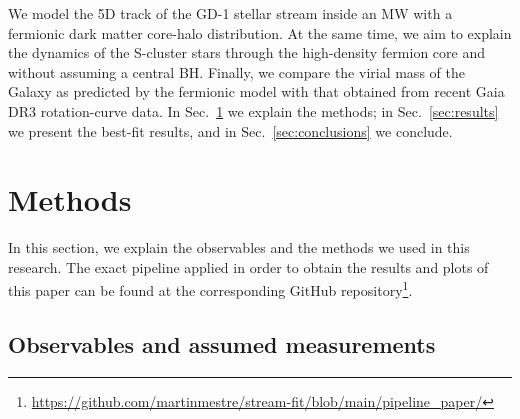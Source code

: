 \documentclass[twocolumn]{aa}
\begin{document}
We model the 5D track of the GD-1 stellar stream inside an MW with a fermionic dark matter core-halo distribution. At the same time, we aim to explain the dynamics of the S-cluster stars through the high-density fermion core and without assuming a central BH. Finally, we compare the virial mass of the Galaxy as predicted by the fermionic model with that obtained from recent Gaia DR3 rotation-curve data. In Sec.~\ref{sec:methodology} we explain the methods; in Sec.~\ref{sec:results} we present the best-fit results, and in Sec.~\ref{sec:conclusions} we conclude.

\section{Methods}
\label{sec:methodology}
In this section, we explain the observables and the methods we used in this research.
The exact pipeline applied in order to obtain the results and plots of this paper
can be found at the corresponding GitHub repository\footnote{
\url{https://github.com/martinmestre/stream-fit/blob/main/pipeline_paper/}}.

\subsection{Observables and assumed measurements}
\label{sec:observables}
\end{document}
